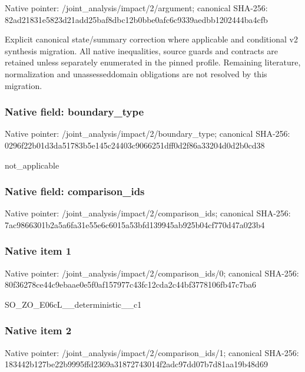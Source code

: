 \documentclass[10pt,a4paper]{article}
\begin{document}
Native pointer: /joint\_analysis/impact/2/argument; canonical SHA-256: 82ad21831e5823d21add25ba\allowbreak{}f8dbc12b0bbe0afc6c9339ae\allowbreak{}dbb1202444ba4cfb


Explicit canonical state/summary correction where applicable and conditional v2 synthesis migration. All native inequalities, source guards and contracts are retained unless separately enumerated in the pinned profile. Remaining literature, normalization and unassesseddomain obligations are not resolved by this migration.


\subsubsection{Native field: boundary\_type}


Native pointer: /joint\_analysis/impact/2/boundary\_type; canonical SHA-256: 0296f22b01d3da51783b5e14\allowbreak{}5c24403c9066251dff0d2f86\allowbreak{}a33204d0d2b0cd38


not\_applicable


\subsubsection{Native field: comparison\_ids}


Native pointer: /joint\_analysis/impact/2/comparison\_ids; canonical SHA-256: 7ac9866301b2a5a6fa31e55e\allowbreak{}6c6015a53bfd139945ab925b\allowbreak{}04cf770d47a023b4



\subsubsection{Native item 1}


Native pointer: /joint\_analysis/impact/2\allowbreak{}/comparison\_ids/0; canonical SHA-256: 80f36278ce44c9ebaae0e5f0\allowbreak{}af157977c43fc12cda2c44bf\allowbreak{}3778106fb47c7ba6


SO\_ZO\_E06cL\_\_deterministic\_\_c1


\subsubsection{Native item 2}


Native pointer: /joint\_analysis/impact/2\allowbreak{}/comparison\_ids/1; canonical SHA-256: 183442b127be22b9995ffd23\allowbreak{}69a31872743014f2adc97dd0\allowbreak{}7b7d81aa19b48d69
\end{document}
